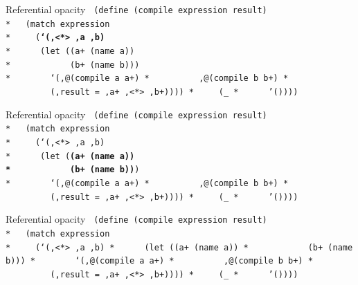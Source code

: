 \documentclass{beamer}
\begin{document}
\begin{frame}{Referential opacity}
  \texttt{
    (define (compile expression result) \\*
    \ \ (match expression \\*
    \ \ \ \ (\textbf{`(,<*> ,a ,b)} \\*
    \ \ \ \ \ (let ((a+ (name a)) \\*
    \ \ \ \ \ \ \ \ \ \ \ (b+ (name b))) \\*
    \ \ \ \ \ \ \ `(,@(compile a a+)\\*
    \ \ \ \ \ \ \ \ \ ,@(compile b b+)\\*
    \ \ \ \ \ \ \ \ \ (,result = ,a+ ,<*> ,b+))))\\*
    \ \ \ \ (\_\\*
    \ \ \ \ \ '())))
  }
\end{frame}

\begin{frame}{Referential opacity}
  \texttt{
    (define (compile expression result) \\*
    \ \ (match expression \\*
    \ \ \ \ (`(,<*> ,a ,b) \\*
    \ \ \ \ \ (let (\textbf{(a+ (name a)) \\*
    \ \ \ \ \ \ \ \ \ \ \ (b+ (name b))}) \\*
    \ \ \ \ \ \ \ `(,@(compile a a+)\\*
    \ \ \ \ \ \ \ \ \ ,@(compile b b+)\\*
    \ \ \ \ \ \ \ \ \ (,result = ,a+ ,<*> ,b+))))\\*
    \ \ \ \ (\_\\*
    \ \ \ \ \ '())))
  }
\end{frame}

\begin{frame}{Referential opacity}
  \texttt{
    (define (compile expression result) \\*
    \ \ (match expression \\*
    \ \ \ \ (`(,<*> ,a ,b) \\*
    \ \ \ \ \ (let ((a+ (name a)) \\*
    \ \ \ \ \ \ \ \ \ \ \ (b+ (name b))) \\*
    \ \ \ \ \ \ \ \textbf{`(,@(compile a a+)\\*
    \ \ \ \ \ \ \ \ \ ,@(compile b b+)\\*
    \ \ \ \ \ \ \ \ \ (,result = ,a+ ,<*> ,b+))}))\\*
    \ \ \ \ (\_\\*
    \ \ \ \ \ '())))
  }
\end{frame}
\end{document}
